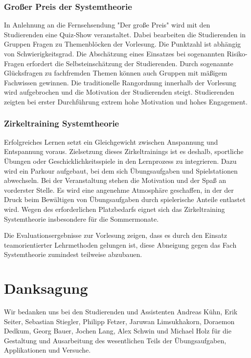\subsubsection{Großer Preis der Systemtheorie}\label{sec:grouxdfer-preis-der-systemtheorie}

In Anlehnung an die Fernsehsendung "Der große Preis" wird mit den Studierenden eine Quiz-Show veranstaltet. Dabei bearbeiten die Studierenden in Gruppen Fragen zu Themenblöcken der Vorlesung. Die Punktzahl ist abhängig von Schwierigkeitsgrad. Die Abschätzung eines Einsatzes bei sogenannten Risiko-Fragen erfordert die Selbsteinschätzung der Studierenden. Durch sogenannte Glücksfragen zu fachfremden Themen können auch Gruppen mit mäßigem Fachwissen gewinnen. Die traditionelle Rangordnung innerhalb der Vorlesung wird aufgebrochen und die Motivation der Studierenden steigt. Studierenden zeigten bei erster Durchführung extrem hohe Motivation und hohes Engagement.

\subsubsection{Zirkeltraining Systemtheorie}\label{sec:zirkeltraining-systemtheorie}

Erfolgreiches Lernen setzt ein Gleichgewicht zwischen Anspannung und Entspannung voraus. Zielsetzung dieses Zirkeltrainings ist es deshalb, sportliche Übungen oder Geschicklichkeitsspiele in den Lernprozess zu integrieren. Dazu wird ein Parkour aufgebaut, bei dem sich Übungsaufgaben und Spielstationen abwechseln. Bei der Veranstaltung stehen die Motivation und der Spaß an vorderster Stelle. Es wird eine angenehme Atmosphäre geschaffen, in der der Druck beim Bewältigen von Übungsaufgaben durch spielerische Anteile entlastet wird. Wegen des erforderlichen Platzbedarfs eignet sich das Zirkeltraining Systemtheorie insbesondere für die Sommermonate.

Die Evaluationsergebnisse zur Vorlesung zeigen, dass es durch den Einsatz teamorientierter Lehrmethoden gelungen ist, diese Abneigung gegen das Fach Systemtheorie zumindest teilweise abzubauen.

\section{Danksagung}\label{sec:1.3}

Wir bedanken uns bei den Studierenden und Assistenten Andreas Kühn, Erik Seiter, Sebastian Stiegler, Philipp Fetzer, Jaruwan Limsukhakorn, Doraemon Dedkum, Georg Bauer, Jochen Lang, Alex Schwin und Michael Holz für die Gestaltung und Ausarbeitung des wesentlichen Teils der Übungsaufgaben, Applikationen und Versuche.

